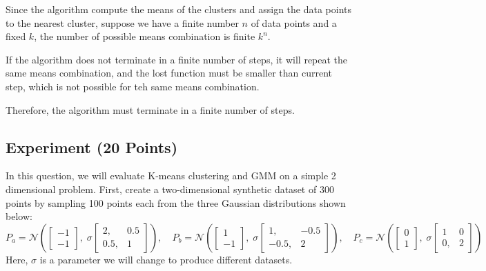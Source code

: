 \documentclass[a4paper]{article}
\newcounter{thm}
\newcommand{\Ncal}{\mathcal{N}}
\theoremstyle{definition}
\newenvironment{soln}{
    \leavevmode\color{blue}\ignorespaces
}{}
\begin{document}
\begin{enumerate}
	      \begin{soln}
		      Since the algorithm compute the means of the clusters and assign the data points to the nearest cluster, suppose we have a finite number $n$ of data points and a fixed $k$, the number of possible means combination is finite $k^n$.

		      If the algorithm does not terminate in a finite number of steps, it will repeat the same means combination, and the lost function must be smaller than current step, which is not possible for teh same means combination.

		      Therefore, the algorithm must terminate in a finite number of steps.

	      \end{soln}

\end{enumerate}



\subsection{Experiment (20 Points)}

In this question, we will evaluate
K-means clustering and GMM on a simple 2 dimensional problem.
First, create a two-dimensional synthetic dataset of 300 points by sampling 100 points each from the
three Gaussian distributions shown below:
\[
	P_a = \Ncal\left(
	\begin{bmatrix}
			-1 \\ -1
		\end{bmatrix},
	\;
	\sigma\begin{bmatrix}
			2, & 0.5 \\ 0.5, &1
		\end{bmatrix}
	\right),
	\quad
	P_b = \Ncal\left(
	\begin{bmatrix}
			1 \\ -1
		\end{bmatrix},
	\;
	\sigma\begin{bmatrix}
			1, & -0.5 \\ -0.5, &2
		\end{bmatrix}
	\right),
	\quad
	P_c = \Ncal\left(
	\begin{bmatrix}
			0 \\ 1
		\end{bmatrix},
	\;
	\sigma\begin{bmatrix}
			1 & 0 \\ 0, &2
		\end{bmatrix}
	\right)
\]
Here, $\sigma$ is a parameter we will change to produce different datasets.\\
\end{document}
